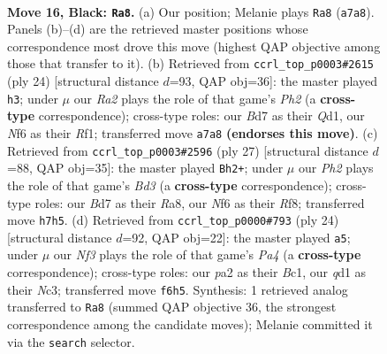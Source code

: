 \documentclass[11pt]{article}
\begin{document}
\clearpage

\begin{figure}[p]\centering
\begin{subfigure}{0.46\textwidth}\centering
\resizebox{\linewidth}{!}{%
\newchessgame
\chessboard[
  setfen={1nr3k1/rp1b1ppp/p1qbpn2/8/7N/3BP3/PP1BNPPP/R2QR1K1 b - - 13 16},
  showmover=false,
  pgfstyle=straightmove, color=movearrow, markmove={a7-a8}
]}
\caption{}
\end{subfigure}\hfill
\begin{subfigure}{0.46\textwidth}\centering
\resizebox{\linewidth}{!}{%
\newchessgame
\chessboard[
  setfen={rnbqr1k1/pp3pb1/3p1npp/2pP4/2P4N/2N5/PP1BBPPP/R2Q1RK1 w - - 3 13},
  showmover=false,
  pgfstyle=straightmove, color=movearrow, markmove={h2-h3}
]}
\caption{}
\end{subfigure}
\\[4pt]
\begin{subfigure}{0.46\textwidth}\centering
\resizebox{\linewidth}{!}{%
\newchessgame
\chessboard[
  setfen={r4rk1/ppq1npp1/2nbb2p/3p4/3P3N/3B3P/PP1BNPP1/R2QR1K1 b - - 6 14},
  showmover=false,
  pgfstyle=straightmove, color=movearrow, markmove={d6-h2}
]}
\caption{}
\end{subfigure}\hfill
\begin{subfigure}{0.46\textwidth}\centering
\resizebox{\linewidth}{!}{%
\newchessgame
\chessboard[
  setfen={rn1q1rk1/pb3pbp/3p1np1/1Pp5/P7/2NB1N1P/1P3PP1/R1BQ1RK1 w - - 2 13},
  showmover=false,
  pgfstyle=straightmove, color=movearrow, markmove={a4-a5}
]}
\caption{}
\end{subfigure}
\caption{\textbf{Move 16, Black: \texttt{Ra8}.} (a) Our position; Melanie plays \texttt{Ra8} (\texttt{a7a8}). Panels (b)--(d) are the retrieved master positions whose correspondence most drove this move (highest QAP objective among those that transfer to it). (b) Retrieved from \texttt{ccrl\_top\_p0003\#2615} (ply 24) [structural distance $d$=93, QAP obj=36]: the master played \texttt{h3}; under $\mu$ our \emph{Ra2} plays the role of that game's \emph{Ph2} (a \textbf{cross-type} correspondence); cross-type roles: our \emph{B}d7 as their \emph{Q}d1, our \emph{N}f6 as their \emph{R}f1; transferred move \texttt{a7a8} \textbf{(endorses this move)}. (c) Retrieved from \texttt{ccrl\_top\_p0003\#2596} (ply 27) [structural distance $d$=88, QAP obj=35]: the master played \texttt{Bh2+}; under $\mu$ our \emph{Ph2} plays the role of that game's \emph{Bd3} (a \textbf{cross-type} correspondence); cross-type roles: our \emph{B}d7 as their \emph{R}a8, our \emph{N}f6 as their \emph{R}f8; transferred move \texttt{h7h5}. (d) Retrieved from \texttt{ccrl\_top\_p0000\#793} (ply 24) [structural distance $d$=92, QAP obj=22]: the master played \texttt{a5}; under $\mu$ our \emph{Nf3} plays the role of that game's \emph{Pa4} (a \textbf{cross-type} correspondence); cross-type roles: our \emph{p}a2 as their \emph{B}c1, our \emph{q}d1 as their \emph{N}c3; transferred move \texttt{f6h5}. Synthesis: 1 retrieved analog transferred to \texttt{Ra8} (summed QAP objective 36, the strongest correspondence among the candidate moves); Melanie committed it via the \texttt{search} selector.}
\label{fig:thought-m31}
\end{figure}
\end{document}
